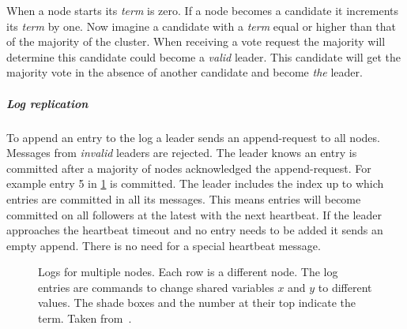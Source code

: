 When a node starts its \textit{term} is zero. If a node becomes a candidate it increments its \textit{term} by one. Now imagine a candidate with a \textit{term} equal or higher than that of the majority of the cluster. When receiving a vote request the majority will determine this candidate could become a \emph{valid} leader. This candidate will get the majority vote in the absence of another candidate and become \textit{the} leader.

\subparagraph{Log replication}
To append an entry to the log a leader sends an append-request to all nodes. Messages from \textit{invalid} leaders  are rejected. The leader knows an entry is committed after a majority of nodes acknowledged the append-request. For example entry 5 in \cref{fig:raft_entries} is committed. The leader includes the index up to which entries are committed in all its messages. This means entries will become committed on all followers at the latest with the next heartbeat. If the leader approaches the heartbeat timeout and no entry needs to be added it sends an empty append. There is no need for a special heartbeat message.

\begin{figure}[htbp]
	\centering
	
	\caption{Logs for multiple nodes. Each row is a different node. The log entries are commands to change shared variables $x$ and $y$ to different values. The shade boxes and the number at their top indicate the term. Taken from~\cite{raft}.}
	\label{fig:raft_entries}
\end{figure}

